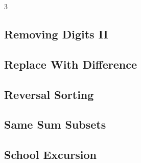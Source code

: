 \documentclass[8pt]{extarticle}
\begin{document}
\begin{multicols*}{3}
\subsection{Removing Digits II}
\begin{caixaenunciado}

\end{caixaenunciado}
\vspace{0.3cm}


\subsection{Replace With Difference}
\begin{caixaenunciado}

\end{caixaenunciado}
\vspace{0.3cm}


\subsection{Reversal Sorting}
\begin{caixaenunciado}

\end{caixaenunciado}
\vspace{0.3cm}


\subsection{Same Sum Subsets}
\begin{caixaenunciado}

\end{caixaenunciado}
\vspace{0.3cm}


\subsection{School Excursion}
\begin{caixaenunciado}

\end{caixaenunciado}
\vspace{0.3cm}



\end{multicols*}
\end{document}
